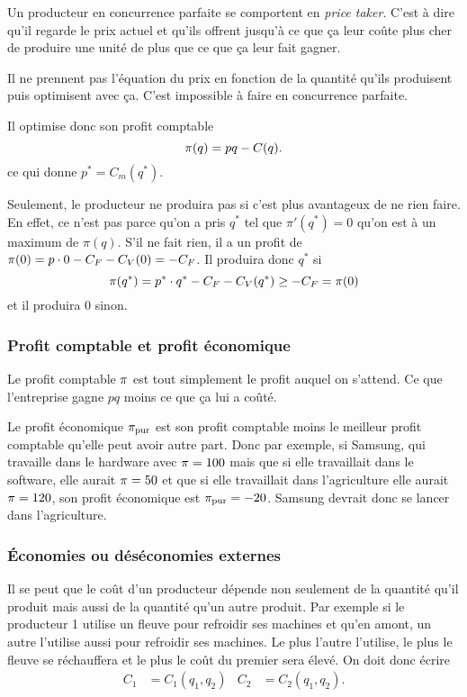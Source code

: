 Un producteur en concurrence parfaite se comportent en \emph{price taker}.
C'est à dire qu'il regarde le prix actuel et qu'ils offrent jusqu'à
ce que ça leur coûte plus cher de produire une unité de plus que ce que
ça leur fait gagner.

Il ne prennent pas l'équation du prix en fonction de la quantité
qu'ils produisent puis optimisent avec ça.
C'est impossible à faire en concurrence parfaite.

Il optimise donc son profit comptable
\[ \pi(q) = pq - C(q). \]
ce qui donne $p^* = C_m(q^*)$.

Seulement, le producteur ne produira pas si c'est plus avantageux de
ne rien faire.
En effet, ce n'est pas parce qu'on a pris $q^*$ tel que $\pi'(q^*) = 0$ qu'on
est à un maximum de $\pi(q)$.
S'il ne fait rien, il a un profit de
$\pi(0) = p \cdot 0 - C_F - C_V(0) = -C_F$.
Il produira donc $q^*$ si
\[ \pi(q^*) = p^* \cdot q^* - C_F - C_V(q^*) \geq -C_F = \pi(0) \]
et il produira 0 sinon.

\subsubsection{Profit comptable et profit économique}
Le profit comptable $\pi$ est tout simplement le profit auquel on s'attend.
Ce que l'entreprise gagne $pq$ moins ce que ça lui a coûté.

Le profit économique $\pi_{\mathrm{pur}}$ est son profit comptable moins le meilleur
profit comptable qu'elle peut avoir autre part.
Donc par exemple, si Samsung, qui travaille dans le hardware avec
$\pi = 100$ mais que si elle travaillait dans le software, elle aurait
$\pi = 50$ et que si elle travaillait dans l'agriculture elle aurait
$\pi = 120$, son profit économique est $\pi_{\mathrm{pur}} = -20$.
Samsung devrait donc se lancer dans l'agriculture.

\subsubsection{Économies ou déséconomies externes}
Il se peut que le coût d'un producteur dépende non seulement de la quantité
qu'il produit mais aussi de la quantité qu'un autre produit.
Par exemple si le producteur 1 utilise un fleuve pour refroidir ses
machines et qu'en amont, un autre l'utilise aussi pour refroidir ses machines.
Le plus l'autre l'utilise, le plus le fleuve se réchauffera et le plus le
coût du premier sera élevé.
On doit donc écrire
\begin{align*}
  C_1 & = C_1(q_1, q_2) & C_2 & = C_2(q_1,q_2).
\end{align*}

